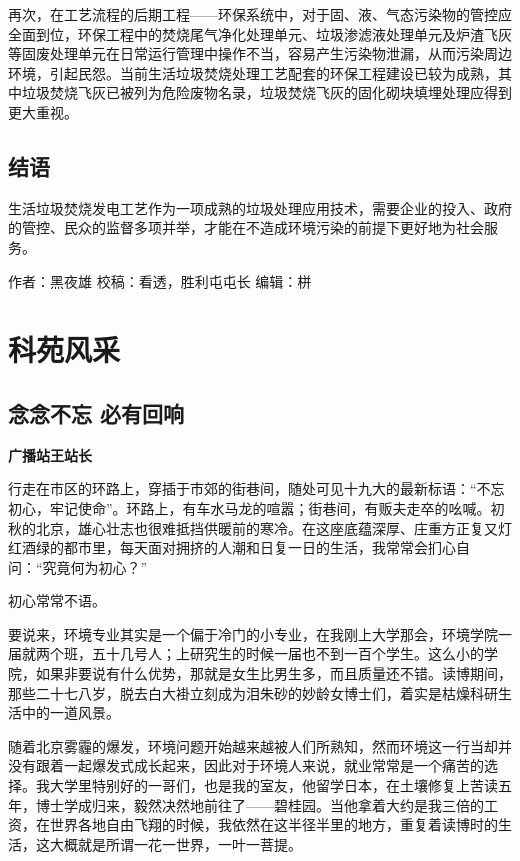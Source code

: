\documentclass[]{book}
\begin{document}
再次，在工艺流程的后期工程------环保系统中，对于固、液、气态污染物的管控应全面到位，环保工程中的焚烧尾气净化处理单元、垃圾渗滤液处理单元及炉渣飞灰等固废处理单元在日常运行管理中操作不当，容易产生污染物泄漏，从而污染周边环境，引起民怨。当前生活垃圾焚烧处理工艺配套的环保工程建设已较为成熟，其中垃圾焚烧飞灰已被列为危险废物名录，垃圾焚烧飞灰的固化砌块填埋处理应得到更大重视。

\section{结语}\label{-7}

生活垃圾焚烧发电工艺作为一项成熟的垃圾处理应用技术，需要企业的投入、政府的管控、民众的监督多项并举，才能在不造成环境污染的前提下更好地为社会服务。

作者：黑夜雄 校稿：看透，胜利屯屯长 编辑：栟

\chapter{科苑风采}

\section{念念不忘 必有回响}\label{-}

\textbf{广播站王站长}

行走在市区的环路上，穿插于市郊的街巷间，随处可见十九大的最新标语：``不忘初心，牢记使命''。环路上，有车水马龙的喧嚣；街巷间，有贩夫走卒的吆喊。初秋的北京，雄心壮志也很难抵挡供暖前的寒冷。在这座底蕴深厚、庄重方正复又灯红酒绿的都市里，每天面对拥挤的人潮和日复一日的生活，我常常会扪心自问：``究竟何为初心？''

初心常常不语。

要说来，环境专业其实是一个偏于冷门的小专业，在我刚上大学那会，环境学院一届就两个班，五十几号人；上研究生的时候一届也不到一百个学生。这么小的学院，如果非要说有什么优势，那就是女生比男生多，而且质量还不错。读博期间，那些二十七八岁，脱去白大褂立刻成为泪朱砂的妙龄女博士们，着实是枯燥科研生活中的一道风景。

随着北京雾霾的爆发，环境问题开始越来越被人们所熟知，然而环境这一行当却并没有跟着一起爆发式成长起来，因此对于环境人来说，就业常常是一个痛苦的选择。我大学里特别好的一哥们，也是我的室友，他留学日本，在土壤修复上苦读五年，博士学成归来，毅然决然地前往了------碧桂园。当他拿着大约是我三倍的工资，在世界各地自由飞翔的时候，我依然在这半径半里的地方，重复着读博时的生活，这大概就是所谓一花一世界，一叶一菩提。
\end{document}

